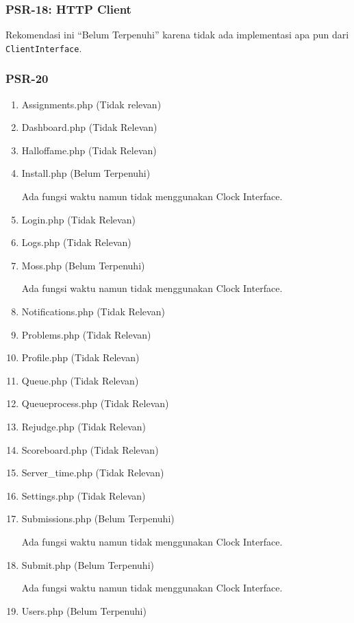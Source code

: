 \subsubsection{PSR-18: HTTP Client}
Rekomendasi ini ``Belum Terpenuhi'' karena tidak ada implementasi apa pun dari \verb|ClientInterface|.

\subsubsection{PSR-20}
\begin{enumerate}
	\item Assignments.php (Tidak relevan) %
	\item Dashboard.php (Tidak Relevan)
	\item Halloffame.php (Tidak Relevan)
	\item Install.php (Belum Terpenuhi)
	
	Ada fungsi waktu namun tidak menggunakan Clock Interface.
	
	\item Login.php (Tidak Relevan)
	\item Logs.php (Tidak Relevan)
	\item Moss.php (Belum Terpenuhi)
	
	Ada fungsi waktu namun tidak menggunakan Clock Interface.
	
	\item Notifications.php (Tidak Relevan)
	\item Problems.php (Tidak Relevan)
	\item Profile.php (Tidak Relevan)
	\item Queue.php (Tidak Relevan)
	\item Queueprocess.php (Tidak Relevan)
	\item Rejudge.php (Tidak Relevan)
	\item Scoreboard.php (Tidak Relevan)
	\item Server\_time.php (Tidak Relevan)
	\item Settings.php (Tidak Relevan)
	\item Submissions.php (Belum Terpenuhi)
	
	Ada fungsi waktu namun tidak menggunakan Clock Interface.
	
	\item Submit.php (Belum Terpenuhi)
	
	Ada fungsi waktu namun tidak menggunakan Clock Interface.
	
	\item Users.php (Belum Terpenuhi)
	

\end{enumerate}
